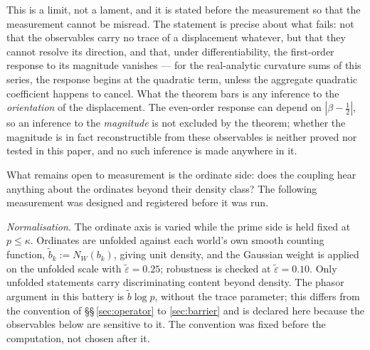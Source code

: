 \documentclass[11pt]{article}
\begin{document}
This is a limit, not a lament, and it is stated before the measurement so that
the measurement cannot be misread. The statement is precise about what fails:
not that the observables carry no trace of a displacement whatever, but that
they cannot resolve its direction, and that, under differentiability, the
first-order response to its magnitude vanishes --- for the real-analytic
curvature sums of this series, the response begins at the quadratic
term, unless the aggregate quadratic coefficient happens to cancel. What
the theorem bars is any inference to the
\emph{orientation} of the displacement. The even-order response can depend on
$|\beta-\tfrac12|$, so an inference to the \emph{magnitude} is not excluded by
the theorem; whether the magnitude is in fact reconstructible from these
observables is neither proved nor tested in this paper, and no such inference
is made anywhere in it.

What remains open to measurement is the ordinate side: does the coupling hear
anything about the ordinates beyond their density class? The following
measurement was designed and registered before it was run.

\emph{Normalisation.} The ordinate axis is varied while the prime side is held
fixed at $p\le\kappa$. Ordinates are unfolded against each world's own smooth
counting function, $\tilde b_k:=N_W(b_k)$, giving unit density, and the
Gaussian weight is applied on the unfolded scale with
$\tilde\varepsilon=0.25$; robustness is checked at $\tilde\varepsilon=0.10$.
Only unfolded statements carry discriminating content beyond density. The
phasor argument in this battery is $\tilde b\log p$, without the trace
parameter; this differs from the convention of \S\S\,\ref{sec:operator} to
\ref{sec:barrier} and is declared here because the observables below are
sensitive to it. The convention was fixed before the computation, not chosen
after it.
\end{document}
